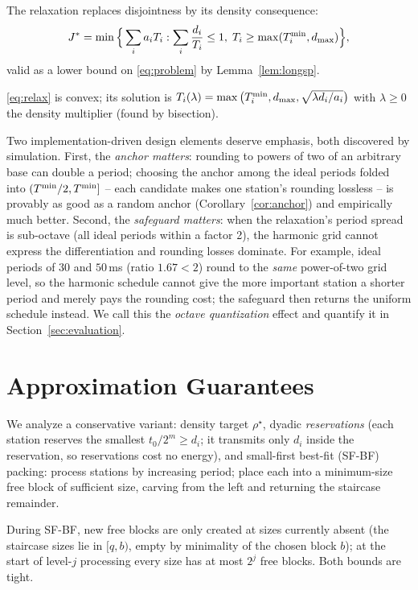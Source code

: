 The relaxation replaces disjointness by its density consequence:
\begin{equation}
J^* = \min\Big\{ \sum_i a_i T_i : \sum_i \frac{d_i}{T_i} \le 1,\;
T_i \ge \max(T^{\min}_i, d_{\max}) \Big\},
\label{eq:relax}
\end{equation}
valid as a lower bound on \eqref{eq:problem} by Lemma~\ref{lem:longsp}.

\begin{lemma}
\label{lem:relax}
\eqref{eq:relax} is convex; its solution is
$T_i(\lambda) = \max\big(T^{\min}_i, d_{\max}, \sqrt{\lambda d_i / a_i}\big)$ with
$\lambda \ge 0$ the density multiplier (found by bisection).
\end{lemma}

Two implementation-driven design elements deserve emphasis, both discovered
by simulation. First, the \emph{anchor matters}: rounding to powers of two
of an arbitrary base can double a period; choosing the anchor among the
ideal periods folded into $(T^{\min}/2, T^{\min}]$ -- each candidate makes one
station's rounding lossless -- is provably as good as a random anchor
(Corollary~\ref{cor:anchor}) and empirically much better. Second, the
\emph{safeguard matters}: when the relaxation's period spread is sub-octave
(all ideal periods within a factor 2), the harmonic grid cannot express the
differentiation and rounding losses dominate. For example, ideal periods of
$30$ and $50$\,ms (ratio $1.67 < 2$) round to the \emph{same} power-of-two
grid level, so the harmonic schedule cannot give the more important station a
shorter period and merely pays the rounding cost; the safeguard then returns
the uniform schedule instead. We call this the \emph{octave quantization}
effect and quantify it in Section~\ref{sec:evaluation}.

\section{Approximation Guarantees}
\label{sec:theory}

We analyze a conservative variant: density target $\rho^\star$, dyadic
\emph{reservations} (each station reserves the smallest $t_0/2^m \ge d_i$;
it transmits only $d_i$ inside the reservation, so reservations cost no
energy), and small-first best-fit (SF-BF) packing: process stations by
increasing period; place each into a minimum-size free block of sufficient
size, carving from the left and returning the staircase remainder.

\begin{lemma}
\label{lem:counts}
During SF-BF, new free blocks are only created at sizes currently absent
(the staircase sizes lie in $[q, b)$, empty by minimality of the chosen
block $b$); at the start of level-$j$ processing every size has at most
$2^j$ free blocks. Both bounds are tight.
\end{lemma}

